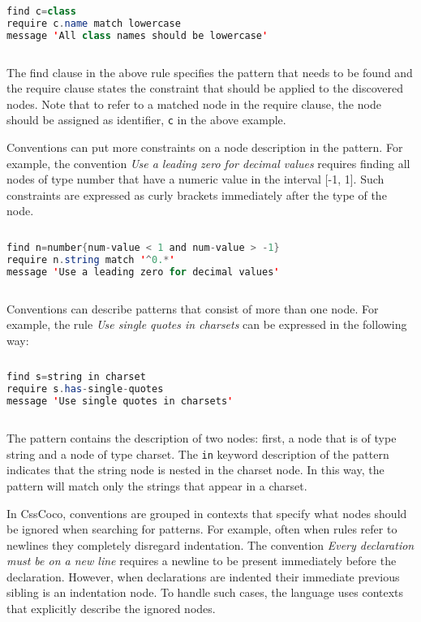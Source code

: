\begin{sourcecode}
\begin{lstlisting}[style=mono,language=Java]
find c=class
require c.name match lowercase
message 'All class names should be lowercase'
\end{lstlisting}
\end{sourcecode}

The find clause in the above rule specifies the pattern that needs to be found and the require
clause states the constraint that should be applied to the discovered nodes. Note that to refer to a
matched node in the require clause, the node should be assigned as identifier, \texttt{c} in the
above example.

Conventions can put more constraints on a node description in the pattern. For example, the
convention \textit{Use a leading zero for decimal values} requires finding all nodes of type number
that have a numeric value in the interval [-1, 1]. Such constraints are expressed as curly brackets
immediately after the type of the node.

\begin{sourcecode}
\begin{lstlisting}[style=mono,language=Java]
find n=number{num-value < 1 and num-value > -1}
require n.string match '^0.*'
message 'Use a leading zero for decimal values'
\end{lstlisting}
\end{sourcecode}

Conventions can describe patterns that consist of more than one node. For example, the rule
\textit{Use single quotes in charsets} can be expressed in the following way:

\begin{sourcecode}
\begin{lstlisting}[style=mono,language=Java]
find s=string in charset
require s.has-single-quotes
message 'Use single quotes in charsets'
\end{lstlisting}
\end{sourcecode}

The pattern contains the description of two nodes: first, a node that is of type string and a node
of type charset. The \texttt{in} keyword description of the pattern indicates that the string node
is nested in the charset node. In this way, the pattern will match only the strings that appear in a
charset.

In CssCoco, conventions are grouped in contexts that specify what nodes should be ignored when
searching for patterns. For example, often when rules refer to newlines they completely disregard
indentation. The convention \textit{Every declaration must be on a new line} requires a newline to
be present immediately before the declaration. However, when declarations are indented their
immediate previous sibling is an indentation node. To handle such cases, the language uses contexts
that explicitly describe the ignored nodes.

